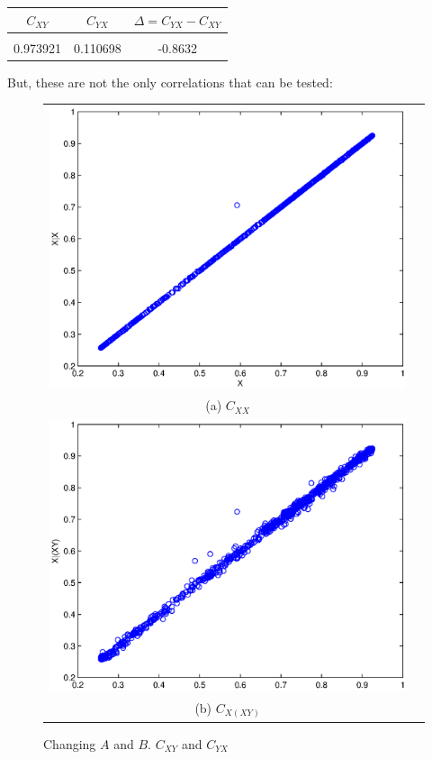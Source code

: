 \documentclass[a4paper,11pt]{article}
\begin{document}
\begin{tabular}{c|c|c}
$C_{XY}$ & $C_{YX}$ & $\Delta=C_{YX}-C_{XY}$ \\
\hline \\
0.973921 & 0.110698 & -0.8632
\end{tabular}

But, these are not the only correlations that can be tested:
\begin{center}
\begin{figure}[H]
\begin{tabular}{cc}
\includegraphics[scale=0.5]{RLCircuitPlots/SugFig3_XgX.eps} \\
(a) $C_{XX}$ \\[6pt]
\includegraphics[scale=0.5]{RLCircuitPlots/SugFig3_XgXY.eps} \\
(b) $C_{X(XY)}$ \\[6pt]
\end{tabular}
\caption{Changing $A$ and $B$.  $C_{XY}$ and $C_{YX}$}
\label{fig1}
\end{figure}
\end{center}
\end{document}

